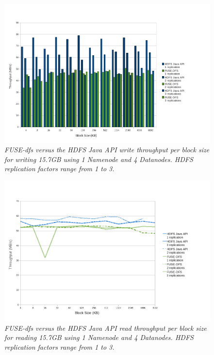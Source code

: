 \documentclass[11]{article}
\begin{document}
\begin{figure}
 \centering
 \includegraphics[totalheight=.25\textheight,
width=.75\textwidth,bb=0 0 985 682, scale=0.50]{images/WriteThroughput-4Datanodes-Bar.png}
 \caption{\emph{FUSE-dfs versus the HDFS Java API \textit{write} throughput per block size 
for writing 15.7GB using \textit{1 Namenode} and \textit{4 Datanodes}. HDFS replication factors range from 1 to 3.}}
\end{figure}

\begin{figure}
 \centering
 \includegraphics[totalheight=.25\textheight,
width=.75\textwidth,bb=0 0 985 682, scale=0.50]{images/ReadThroughput-4Datanodes-Line.png}
 \caption{\emph{FUSE-dfs versus the HDFS Java API \textit{read} throughput per block size 
for reading 15.7GB using \textit{1 Namenode} and \textit{4 Datanodes}. HDFS replication factors range from 1 to 3.}}
\end{figure}
\end{document}
